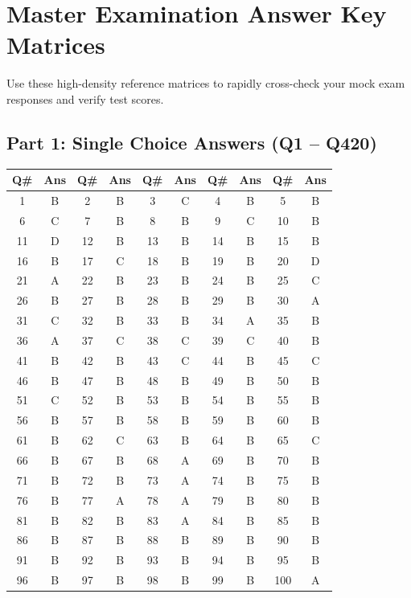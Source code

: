 \section*{Master Examination Answer Key Matrices}

Use these high-density reference matrices to rapidly cross-check your mock exam responses and verify test scores.

\subsection*{Part 1: Single Choice Answers (Q1 -- Q420)}
\small
\begin{longtable}{cc|cc|cc|cc|cc}
\toprule
\textbf{Q\#} & \textbf{Ans} & \textbf{Q\#} & \textbf{Ans} & \textbf{Q\#} & \textbf{Ans} & \textbf{Q\#} & \textbf{Ans} & \textbf{Q\#} & \textbf{Ans} \\
\midrule
\endhead
1 & B & 2 & B & 3 & C & 4 & B & 5 & B \\
6 & C & 7 & B & 8 & B & 9 & C & 10 & B \\
11 & D & 12 & B & 13 & B & 14 & B & 15 & B \\
16 & B & 17 & C & 18 & B & 19 & B & 20 & D \\
21 & A & 22 & B & 23 & B & 24 & B & 25 & C \\
26 & B & 27 & B & 28 & B & 29 & B & 30 & A \\
31 & C & 32 & B & 33 & B & 34 & A & 35 & B \\
36 & A & 37 & C & 38 & C & 39 & C & 40 & B \\
41 & B & 42 & B & 43 & C & 44 & B & 45 & C \\
46 & B & 47 & B & 48 & B & 49 & B & 50 & B \\
51 & C & 52 & B & 53 & B & 54 & B & 55 & B \\
56 & B & 57 & B & 58 & B & 59 & B & 60 & B \\
61 & B & 62 & C & 63 & B & 64 & B & 65 & C \\
66 & B & 67 & B & 68 & A & 69 & B & 70 & B \\
71 & B & 72 & B & 73 & A & 74 & B & 75 & B \\
76 & B & 77 & A & 78 & A & 79 & B & 80 & B \\
81 & B & 82 & B & 83 & A & 84 & B & 85 & B \\
86 & B & 87 & B & 88 & B & 89 & B & 90 & B \\
91 & B & 92 & B & 93 & B & 94 & B & 95 & B \\
96 & B & 97 & B & 98 & B & 99 & B & 100 & A \\

\end{longtable}
